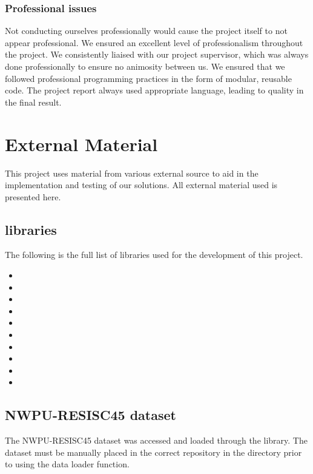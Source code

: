 \begin{appendices}
\subsection{Professional issues}
Not conducting ourselves professionally would cause the project itself to not appear professional. We ensured an excellent level of professionalism throughout the project. We consistently liaised with our project supervisor, which was always done professionally to ensure no animosity between us. We ensured that we followed professional programming practices in the form of modular, reusable code. The project report always used appropriate language, leading to quality in the final result.

\chapter{External Material}\label{app:external_material}
This project uses material from various external source to aid in the implementation and testing of our solutions. All external material used is presented here.

\section{ libraries}
The following is the full list of  libraries used for the development of this project.
\begin{itemize}
    \item {}
    \item {}
    \item {}
    \item {}
    \item {}
    \item {}
    \item {}
    \item {}
    \item {}
    \item {}
\end{itemize}

\section{NWPU-RESISC45 dataset}
The NWPU-RESISC45 dataset was accessed and loaded through the  library. The dataset must be manually placed in the correct repository in the  directory prior to using the data loader function. 


\end{appendices}
